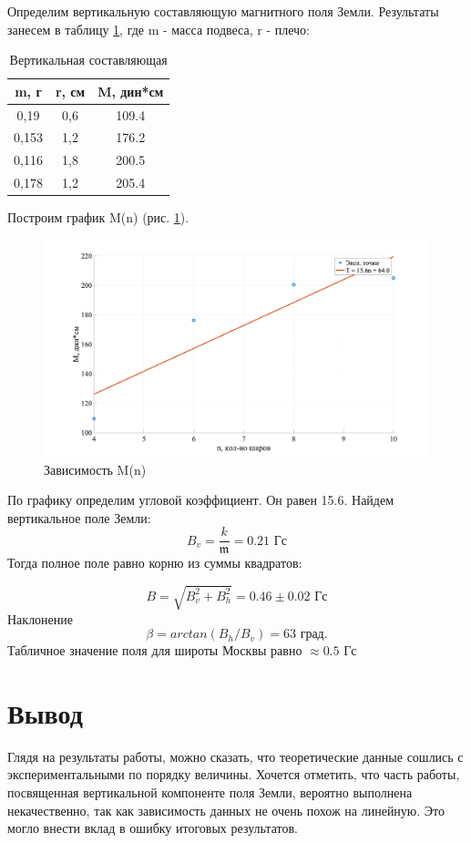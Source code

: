 \documentclass[a4paper, 12pt]{article}
\begin{document}
Определим вертикальную составляющую магнитного поля Земли. Результаты занесем в таблицу \ref{tab:vertic}, где m - масса подвеса, r - плечо:
\begin{table}[H]
	\centering
	\begin{tabular}{|c|c|c|}
	\hline
	m, г  & r, см & M, дин*см \\ \hline
	0,19  & 0,6   & 109.4   \\ \hline
	0,153 & 1,2   & 176.2 \\ \hline
	0,116 & 1,8   & 200.5  \\ \hline
	0,178 & 1,2   & 205.4  \\ \hline
	\end{tabular}
	\caption{Вертикальная составляющая}
	\label{tab:vertic}
\end{table}
Построим график M(n) (рис. \ref{fig:plot2}).
\begin{figure}[h]
    \centering
    \includegraphics[width=1\textwidth]{plot2}
    \caption{Зависимость M(n)}
    \label{fig:plot2}
\end{figure}
По графику определим угловой коэффициент. Он равен 15.6. Найдем вертикальное поле Земли:
\begin{equation}
	B_{v} = \frac{k}{\mathfrak{m}} = 0.21 \text{ Гс}
\end{equation}
Тогда полное поле равно корню из суммы квадратов:

\begin{equation}
	B = \sqrt{B_v^2 + B_h^2} = 0.46 \pm 0.02 \text{ Гс}
\end{equation}
Наклонение
\begin{equation}
	\beta = arctan(B_h/B_v) = 63 \text{ град.}
\end{equation}
Табличное значение поля для широты Москвы равно $\approx 0.5 \text{ Гс}$


\section{Вывод}
Глядя на результаты работы, можно сказать, что теоретические данные сошлись с экспериментальными по порядку величины. Хочется отметить,
что часть работы, посвященная вертикальной компоненте поля Земли, вероятно выполнена некачественно, так как зависимость данных не очень похож на линейную. Это могло внести вклад в ошибку итоговых результатов.
\end{document}
